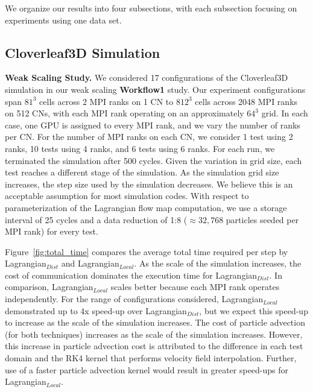 We organize our results into four subsections, with each subsection focusing on experiments using one data set.


\subsection{Cloverleaf3D Simulation}
\label{sec:clover}

\textbf{Weak Scaling Study.} We considered 17 configurations of the Cloverleaf3D simulation in our weak scaling \textbf{Workflow1} study. 
%
Our experiment configurations span $81^{3}$ cells across 2 MPI ranks on 1 CN to $812^{3}$ cells across 2048 MPI ranks on 512 CNs, with each MPI rank operating on an approximately $64^{3}$ grid.
%
In each case, one GPU is assigned to every MPI rank, and we vary the number of ranks per CN.
%
For the number of MPI ranks on each CN, we consider 1 test using 2 ranks, 10 tests using 4 ranks, and 6 tests using 6 ranks.
%
For each run, we terminated the simulation after 500 cycles.
%
Given the variation in grid size, each test reaches a different stage of the simulation.
%
As the simulation grid size increases, the step size used by the simulation decreases.
%
We believe this is an acceptable assumption for most simulation codes.
%
With respect to parameterization of the Lagrangian flow map computation, we use a storage interval of 25 cycles and a data reduction of 1:8 ($\approx32,768$ particles seeded per MPI rank) for every test.

Figure~\ref{fig:total_time} compares the average total time required per step by Lagrangian$_{Dist}$ and Lagrangian$_{Local}$.
%
As the scale of the simulation increases, the cost of communication dominates the execution time for Lagrangian$_{Dist}$.  
%
In comparison, Lagrangian$_{Local}$ scales better because each MPI rank operates independently.
%
For the range of configurations considered, Lagrangian$_{Local}$ demonstrated up to 4x speed-up over Lagrangian$_{Dist}$,
%
but we expect this speed-up to increase as the scale of the simulation increases.
%
The cost of particle advection (for both techniques) increases as the scale of the simulation increases.
%
However, this increase in particle advection cost is attributed to the difference in each test domain and the RK4 kernel that performs velocity field interpolation.
%
%
Further, use of a faster particle advection kernel would result in greater speed-ups for Lagrangian$_{Local}$.

